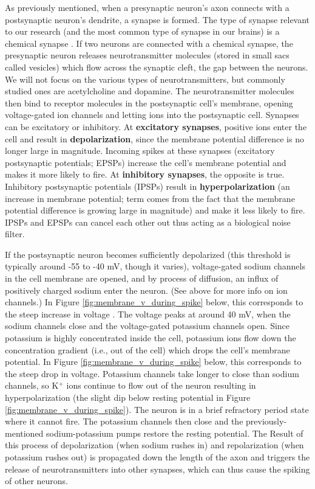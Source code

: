 \documentclass[11pt]{article}
\begin{document}
As previously mentioned, when a presynaptic neuron's axon connects with a postsynaptic neuron's dendrite, a synapse is formed. The type of synapse relevant to our research (and the most common type of synapse in our brains) is a chemical synapse \citep{neuroscience_2nd_edition}. If two neurons are connected with a chemical synapse, the presynaptic neuron releases neurotransmitter molecules (stored in small sacs called vesicles) which flow across the synaptic cleft, the gap between the neurons. We will not focus on the various types of neurotransmitters, but commonly studied ones are acetylcholine and dopamine. The neurotransmitter molecules then bind to receptor molecules in the postsynaptic cell's membrane, opening voltage-gated ion channels and letting ions into the postsynaptic cell. Synapses can be excitatory or inhibitory. At \textbf{excitatory synapses}, positive ions enter the cell and result in \textbf{depolarization}, since the membrane potential difference is no longer large in magnitude. Incoming spikes at these synapses (excitatory postsynaptic potentials; EPSPs) increase the cell's membrane potential and makes it more likely to fire. At \textbf{inhibitory synapses}, the opposite is true. Inhibitory postsynaptic potentials (IPSPs) result in \textbf{hyperpolarization} (an increase in membrane potential; term comes from the fact that the membrane potential difference is growing large in magnitude) and make it less likely to fire. IPSPs and EPSPs can cancel each other out thus acting as a biological noise filter.

If the postsynaptic neuron becomes sufficiently depolarized (this threshold is typically around -55 to -40 mV, though it varies), voltage-gated sodium channels in the cell membrane are opened, and by process of diffusion, an influx of positively charged sodium enter the neuron. (See above for more info on ion channels.) In Figure \ref{fig:membrane_v_during_spike} below, this corresponds to the steep increase in voltage \citep{neuroscience_2nd_edition}. The voltage peaks at around 40 mV, when the sodium channels close and the voltage-gated potassium channels open. Since potassium is highly concentrated inside the cell, potassium ions flow down the concentration gradient (i.e., out of the cell) which drops the cell's membrane potential. In Figure \ref{fig:membrane_v_during_spike} below, this corresponds to the steep drop in voltage. Potassium channels take longer to close than sodium channels, so K$^+$ ions continue to flow out of the neuron resulting in hyperpolarization (the slight dip below resting potential in Figure \ref{fig:membrane_v_during_spike}). The neuron is in a brief refractory period state where it cannot fire. The potassium channels then close and the previously-mentioned sodium-potassium pumps restore the resting potential. The Result of this process of depolarization (when sodium rushes in) and repolarization (when potassium rushes out) is propagated down the length of the axon and triggers the release of neurotransmitters into other synapses, which can thus cause the spiking of other neurons.
\end{document}
